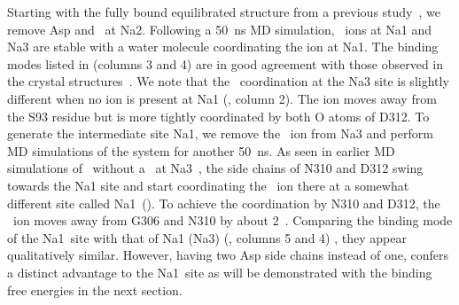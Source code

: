 Starting with the fully bound equilibrated structure from a previous study~\cite{Setiadi2017}, 
we remove Asp and \Na\ at Na2. Following a 50~ns MD simulation, \Na\ ions at Na1 and Na3 are 
stable with a water molecule coordinating the ion at Na1. The binding modes listed in 
 (columns 3 and 4) are in good agreement with those observed in the crystal 
structures~\cite{Boudker2007,Boudker2007}. We note that the \Na\ coordination at the Na3 site 
is slightly different when no ion is present at Na1 (, column 2). The ion 
moves away from the S93 residue but is more tightly coordinated by both O atoms of D312. To 
generate the intermediate site Na1\prim, we remove the \Na\ ion from Na3 and perform MD simulations 
of the system for another 50~ns. As seen in earlier MD simulations of \GltPh\ without a \Na\ at 
Na3~\cite{Huang2010,Bastug2012}, the side chains of N310 and D312 swing towards the Na1 site and 
start coordinating the \Na\ ion there at a somewhat different site called Na1\prim\ 
(). To achieve the coordination by N310 and D312, the \Na\ ion moves away 
from G306 and N310 by about 2~\angs. Comparing the binding mode of the Na1\prim\ site with that of 
Na1 (Na3) (\tabref{bind:tab1}, columns 5 and 4) , they appear qualitatively similar. However, having 
two Asp side chains instead of one, confers a distinct advantage to the Na1\prim\ site as will be 
demonstrated with the binding free energies in the next section. 

